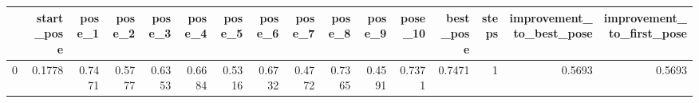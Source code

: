 \begin{tabular}{lrrrrrrrrrrrrrrr}
\toprule
{} &  start\_pose &  pose\_1 &  pose\_2 &  pose\_3 &  pose\_4 &  pose\_5 &  pose\_6 &  pose\_7 &  pose\_8 &  pose\_9 &  pose\_10 &  best\_pose &  steps &  improvement\_to\_best\_pose &  improvement\_to\_first\_pose \\
\midrule
0 &      0.1778 &  0.7471 &  0.5777 &  0.6353 &  0.6684 &  0.5316 &  0.6732 &  0.4772 &  0.7365 &  0.4591 &   0.7371 &     0.7471 &      1 &                    0.5693 &                     0.5693 \\
\bottomrule
\end{tabular}
